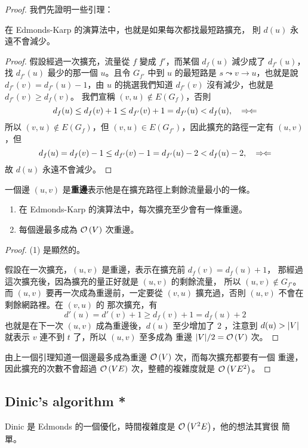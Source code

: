 \documentclass[a4paper,12pt]{book}
\begin{document}
\begin{proof}
我們先證明一些引理：
\begin{lemma}
  在 Edmonds-Karp 的演算法中，也就是如果每次都找最短路擴充，
  則 $d(u)$ 永遠不會減少。
\end{lemma}
\begin{proof}
  假設經過一次擴充，流量從 $f$ 變成 $f'$，而某個 $d_f(u)$ 減少成了 $d_{f'}(u)$，
  找 $d_{f'}(u)$ 最少的那一個 $u$。且令 $G_{f'}$ 中到 $u$ 的最短路是
  $s \leadsto v \rightarrow u$，也就是說 $d_{f'}(v) = d_{f'}(u) - 1$，由 $u$
  的挑選我們知道 $d_{f'}(v)$ 沒有減少，也就是 $d_{f'}(v) \geq d_f(v)$。
  我們宣稱 $(v, u) \notin E(G_f)$，否則
  \[ d_f(u) \leq d_f(v) + 1 \leq d_{f'}(v) + 1 = d_{f'}(u) < d_f(u), \quad \Rightarrow\hspace*{-1pt}\Leftarrow\]
  所以 $(v, u) \notin E(G_f)$，但 $(v, u) \in E(G_{f'})$，因此擴充的路徑一定有 $(u, v)$
  ，但
  \[ d_f(u) = d_f(v) - 1 \leq d_{f'}(v) - 1 = d_{f'}(u) - 2 < d_f(u) - 2, \quad \Rightarrow\hspace*{-1pt}\Leftarrow\]
    故 $d(u)$ 永遠不會減少。
\end{proof}
\begin{definition}
  一個邊 $(u, v)$ 是{\bf 重邊}表示他是在擴充路徑上剩餘流量最小的一條。
\end{definition}
\begin{lemma}
  \pass
  \begin{enumerate}
    \item 在 Edmonds-Karp 的演算法中，每次擴充至少會有一條重邊。
    \item 每個邊最多成為 $\operatorname{\mathcal{O}}\left(V\right)$ 次重邊。
  \end{enumerate}
\end{lemma}
\begin{proof} (1) 是顯然的。
  
  假設在一次擴充，$(u, v)$ 是重邊，表示在擴充前 $d_f(v) = d_f(u) + 1$，
  那經過這次擴充後，因為擴充的量正好就是 $(u, v)$ 的剩餘流量，
  所以 $(u, v) \notin G_{f'}$。而 $(u, v)$ 要再一次成為重邊前，一定要從
  $(v, u)$ 擴充過，否則 $(u, v)$ 不會在剩餘網路裡。在 $(v, u)$ 的
  那次擴充，有
  \[ d'(u) = d'(v) + 1 \geq d_f(v) + 1 = d_f(u) + 2 \]
  也就是在下一次 $(u, v)$ 成為重邊後，$d(u)$ 至少增加了 $2$ ，注意到
  $d(u) > \lvert V \rvert$ 就表示 $v$ 連不到 $t$ 了，所以 $(u, v)$ 至多成為
  重邊 $\lvert V \rvert / 2 = \operatorname{\mathcal{O}}\left(V\right)$ 次。
\end{proof}
由上一個引理知道一個邊最多成為重邊 $\operatorname{\mathcal{O}}\left(V\right)$ 次，而每次擴充都要有一個
重邊，因此擴充的次數不會超過 $\operatorname{\mathcal{O}}\left(VE\right)$ 次，整體的複雜度就是 $\operatorname{\mathcal{O}}\left(VE^2\right)$。
\end{proof}

\subsection{Dinic's algorithm *}
Dinic 是 Edmonds 的一個優化，時間複雜度是 $\operatorname{\mathcal{O}}\left(V^2 E\right)$，他的想法其實很
簡單。
\end{document}
